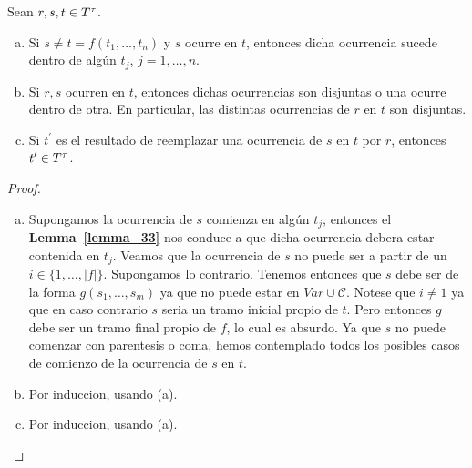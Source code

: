   \begin{lemma} \label{lemma_35}
    \PN Sean $r, s, t \in T^{\tau}$.
    \begin{enumerate}[(a)]
      \item Si $s \neq t = f(t_{1}, \dotsc, t_{n})$ y $s$ ocurre en $t$, entonces dicha ocurrencia sucede dentro de
        algún $t_{j}$, $j = 1, \dotsc, n$.
      \item Si $r, s$ ocurren en $t$, entonces dichas ocurrencias son disjuntas o una ocurre dentro de otra. En
        particular, las distintas ocurrencias de $r$ en $t$ son disjuntas.
      \item Si $t^{\prime}$ es el resultado de reemplazar una ocurrencia de $s$ en $t$ por $r$, entonces $t^{\prime} \in
        T^{\tau}$.
    \end{enumerate}
  \end{lemma}
  \begin{proof}
    \begin{enumerate}[(a)]
      \item Supongamos la ocurrencia de $s$ comienza en algún $t_{j}$, entonces el \textbf{Lemma~\ref{lemma_33}} nos
      conduce a que dicha ocurrencia debera estar contenida en $t_{j}$. Veamos que la ocurrencia de $s$ no puede ser a
      partir de un $i \in \{1, \dotsc, \lvert f \rvert\}$. Supongamos lo contrario. Tenemos entonces que $s$ debe ser
      de la forma $g(s_{1}, \dotsc,s_{m})$ ya que no puede estar en $Var \cup \mathcal{C}$. Notese que $i\neq 1$ ya que
      en caso contrario $s$ seria un tramo inicial propio de $t$. Pero entonces $g$ debe ser un tramo final propio de $f$,
      lo cual es absurdo. Ya que $s$ no puede comenzar con parentesis o coma, hemos contemplado todos los posibles casos
      de comienzo de la ocurrencia de $s$ en $t$.

      \item Por induccion, usando (a).
      \item Por induccion, usando (a).
    \end{enumerate}
  \end{proof}

